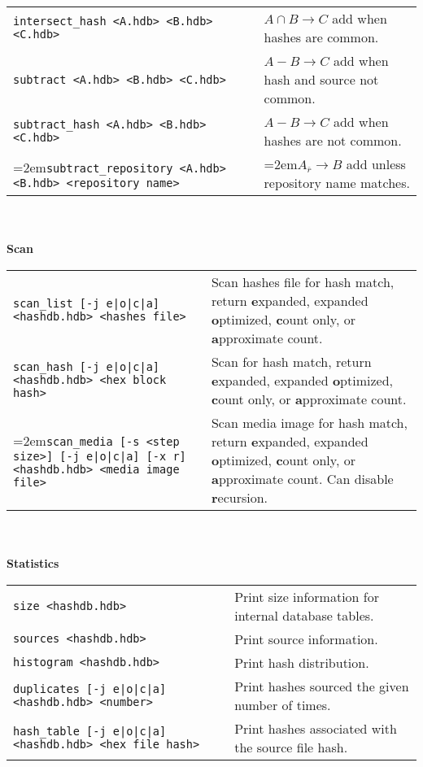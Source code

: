 \begin{footnotesize}
\begin{tabular}{p{3.6 in} p{3.0 in}}
\texttt{intersect\_hash <A.hdb> <B.hdb> <C.hdb>} & $A \cap B \rightarrow C$ add when hashes are common.\\
\texttt{subtract <A.hdb> <B.hdb> <C.hdb>} & $A - B \rightarrow C$ add when hash and source not common.\\
\texttt{subtract\_hash <A.hdb> <B.hdb> <C.hdb>} & $A - B \rightarrow C$ add when hashes are not common.\\
\hangindent=2em\texttt{subtract\_repository <A.hdb> <B.hdb> <repository name>} & \hangindent=2em$A_{\overline{r}} \rightarrow B$ add unless repository name matches.\\
\end{tabular}
\\
\\
\textbf{Scan} \\
\begin{tabular}{p{3.6 in} p{3.0 in}}
\texttt{scan\_list [-j e|o|c|a] <hashdb.hdb> <hashes file>} & Scan hashes file for hash match, return \textbf{e}xpanded, expanded \textbf{o}ptimized, \textbf{c}ount only, or \textbf{a}pproximate count.\\
\texttt{scan\_hash [-j e|o|c|a] <hashdb.hdb> <hex block hash>} & Scan for hash match, return \textbf{e}xpanded, expanded \textbf{o}ptimized, \textbf{c}ount only, or \textbf{a}pproximate count.\\
\hangindent=2em\texttt{scan\_media [-s <step size>] [-j e|o|c|a] [-x r] <hashdb.hdb> <media image file>} & Scan media image for hash match, return \textbf{e}xpanded, expanded \textbf{o}ptimized, \textbf{c}ount only, or \textbf{a}pproximate count. Can disable \textbf{r}ecursion.\\
\end{tabular}
\\
\\
\textbf{Statistics}\\
\begin{tabular}{p{3.6 in} p{3.0 in}}
\texttt{size <hashdb.hdb>} & Print size information for internal database tables.\\
\texttt{sources <hashdb.hdb>} & Print source information.\\
\texttt{histogram <hashdb.hdb>} & Print hash distribution.\\
\texttt{duplicates [-j e|o|c|a] <hashdb.hdb> <number>} & Print hashes sourced the given number of times.\\
\texttt{hash\_table [-j e|o|c|a] <hashdb.hdb> <hex file hash>} & Print hashes associated with the source file hash.\\

\end{tabular}
\end{footnotesize}
